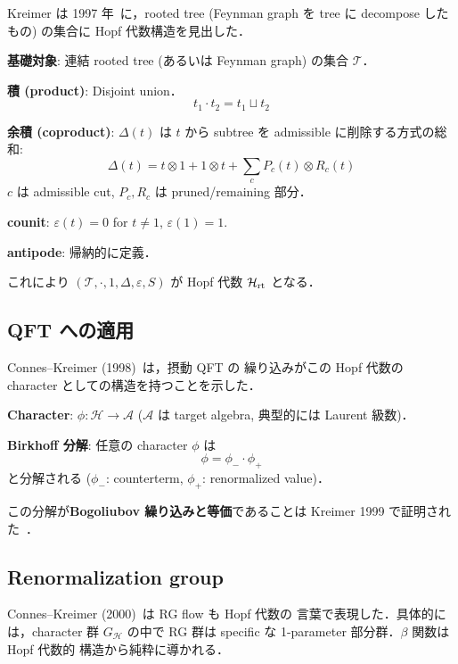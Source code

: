 \documentclass[11pt,a4paper]{article}
\begin{document}
Kreimer は 1997 年~\cite{Kreimer1997}に，rooted tree (Feynman graph を
tree に decompose したもの) の集合に Hopf 代数構造を見出した．

\textbf{基礎対象}: 連結 rooted tree (あるいは Feynman graph) の集合 $\mathcal{T}$．

\textbf{積 (product)}: Disjoint union．
\begin{equation}
t_1 \cdot t_2 = t_1 \sqcup t_2
\end{equation}

\textbf{余積 (coproduct)}: $\Delta(t)$ は $t$ から subtree を admissible
に削除する方式の総和:
\begin{equation}
\Delta(t) = t \otimes 1 + 1 \otimes t + \sum_{c} P_c(t) \otimes R_c(t)
\end{equation}
$c$ は admissible cut, $P_c, R_c$ は pruned/remaining 部分．

\textbf{counit}: $\varepsilon(t) = 0$ for $t \neq 1$, $\varepsilon(1) = 1$.

\textbf{antipode}: 帰納的に定義．

これにより $(\mathcal{T}, \cdot, 1, \Delta, \varepsilon, S)$ が Hopf 代数
$\mathcal{H}_{\rm rt}$ となる．

\subsection{QFT への適用}

Connes--Kreimer (1998)~\cite{ConnesKreimer1998}は，摂動 QFT の
繰り込みがこの Hopf 代数の character としての構造を持つことを示した．

\textbf{Character}: $\phi: \mathcal{H} \to \mathcal{A}$ ($\mathcal{A}$ は
target algebra, 典型的には Laurent 級数)．

\textbf{Birkhoff 分解}: 任意の character $\phi$ は
\begin{equation}
\phi = \phi_- \cdot \phi_+
\end{equation}
と分解される ($\phi_-$: counterterm, $\phi_+$: renormalized value)．

この分解が\textbf{Bogoliubov 繰り込みと等価}であることは Kreimer 1999
で証明された~\cite{Kreimer1999}．

\subsection{Renormalization group}

Connes--Kreimer (2000)~\cite{ConnesKreimer2000}は RG flow も Hopf 代数の
言葉で表現した．具体的には，character 群 $G_\mathcal{H}$ の中で
RG 群は specific な 1-parameter 部分群．$\beta$ 関数は Hopf 代数的
構造から純粋に導かれる．
\end{document}
